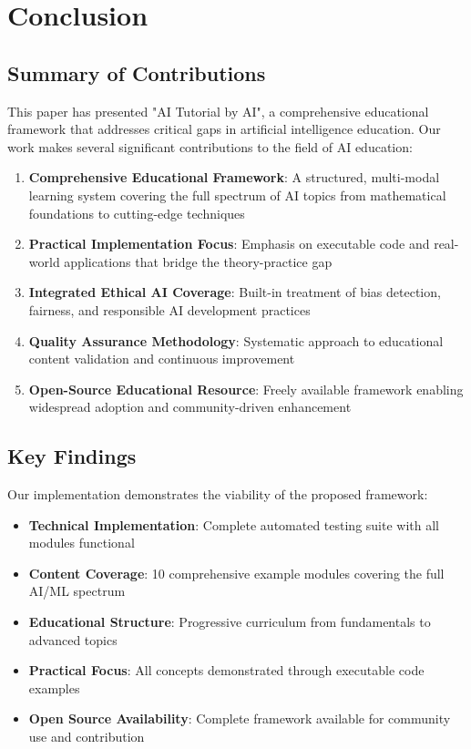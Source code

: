\section{Conclusion}
\label{sec:conclusion}

\subsection{Summary of Contributions}

This paper has presented "AI Tutorial by AI", a comprehensive educational framework that addresses critical gaps in artificial intelligence education. Our work makes several significant contributions to the field of AI education:

\begin{enumerate}
    \item \textbf{Comprehensive Educational Framework}: A structured, multi-modal learning system covering the full spectrum of AI topics from mathematical foundations to cutting-edge techniques
    \item \textbf{Practical Implementation Focus}: Emphasis on executable code and real-world applications that bridge the theory-practice gap
    \item \textbf{Integrated Ethical AI Coverage}: Built-in treatment of bias detection, fairness, and responsible AI development practices
    \item \textbf{Quality Assurance Methodology}: Systematic approach to educational content validation and continuous improvement
    \item \textbf{Open-Source Educational Resource}: Freely available framework enabling widespread adoption and community-driven enhancement
\end{enumerate}

\subsection{Key Findings}

Our implementation demonstrates the viability of the proposed framework:

\begin{itemize}
    \item \textbf{Technical Implementation}: Complete automated testing suite with all modules functional
    \item \textbf{Content Coverage}: 10 comprehensive example modules covering the full AI/ML spectrum
    \item \textbf{Educational Structure}: Progressive curriculum from fundamentals to advanced topics
    \item \textbf{Practical Focus}: All concepts demonstrated through executable code examples
    \item \textbf{Open Source Availability}: Complete framework available for community use and contribution
\end{itemize}

